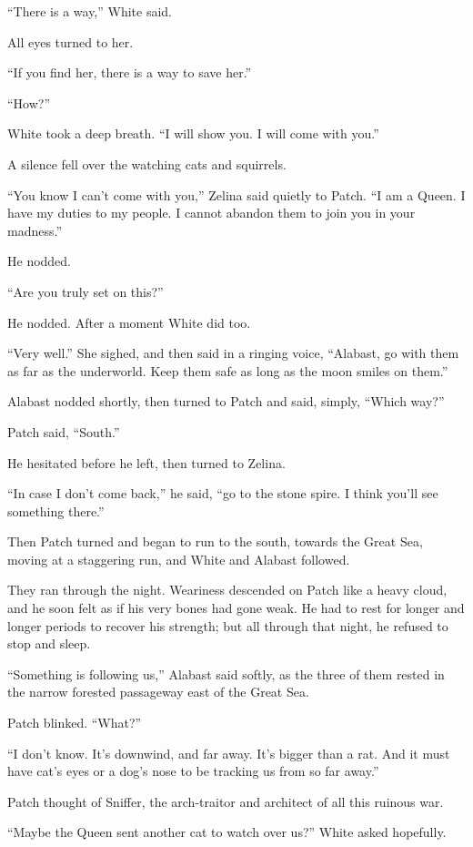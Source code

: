 \documentclass[ebook,oneside,openany,17pt]{memoir}
\begin{document}
“There is a way,” White said.

All eyes turned to her.

“If you find her, there is a way to save her.”

“How?”

White took a deep breath. “I will show you. I will come with you.”

A silence fell over the watching cats and squirrels.

“You know I can’t come with you,” Zelina said quietly to Patch. “I am
a Queen. I have my duties to my people. I cannot abandon them to join
you in your madness.”

He nodded.

“Are you truly set on this?”

He nodded. After a moment White did too.

“Very well.” She sighed, and then said in a ringing voice, “Alabast,
go with them as far as the underworld. Keep them safe as long as the
moon smiles on them.”

Alabast nodded shortly, then turned to Patch and said, simply, “Which
way?”

Patch said, “South.”

He hesitated before he left, then turned to Zelina.

“In case I don’t come back,” he said, “go to the stone spire. I think
you’ll see something there.”

Then Patch turned and began to run to the south, towards the Great
Sea, moving at a staggering run, and White and Alabast followed.

They ran through the night. Weariness descend\-ed on Patch like a heavy
cloud, and he soon felt as if his very bones had gone weak. He had to
rest for longer and longer periods to recover his strength; but all
through that night, he refused to stop and sleep.

“Something is following us,” Alabast said softly, as the three of them
rested in the narrow forested passageway east of the Great Sea.

Patch blinked. “What?”

“I don’t know. It’s downwind, and far away. It’s bigger than a
rat. And it must have cat’s eyes or a dog’s nose to be tracking us
from so far away.”

Patch thought of Sniffer, the arch-traitor and architect of all this
ruinous war.

“Maybe the Queen sent another cat to watch over us?” White asked
hopefully.
\end{document}

